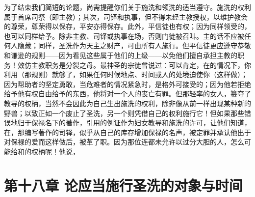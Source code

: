 为了结束我们简短的论题，尚需提醒你们关于施洗和领洗的适当遵守。施洗的权利属于首席司祭（即主教）；其次，司铎和执事，但不得未经主教授权，以维护教会的尊荣，尊荣得以保存，平安亦得保存。此外，平信徒也有权；因为同样领受的，也可以同样给予。除非主教、司铎或执事在场，否则门徒被召叫。主的话不应被任何人隐藏；同样，圣洗作为天主之财产，可由所有人施行。但平信徒更应遵守恭敬和谦逊的规则——因为看见这些属于他们的上级——以免他们擅自承担主教的职务！效仿主教职务是分裂之母。最神圣的宗徒曾说过：可以肯定，在的情况下，你利用（那规则）就够了，如果任何时候地点、时间或人的处境迫使你（这样做）；因为帮助者的坚定勇敢，当危难者的情况紧急时，是格外可接受的；因为他若拒绝给予他有权自由给予的东西，他将对一个人的丧亡有罪。但那轻率的女人，篡夺了教导的权柄，当然不会因此为自己生出施洗的权利，除非像从前一样出现某种新的野兽；以致正如一个废止了圣洗，另一个则凭借自己的权利施行它！但如果那些错误地归于保禄名下的著作，引用的例证作为妇女教导和施洗的许可，让他们知道，在，那编写著作的司铎，似乎从自己的库存增加保禄的名声，被定罪并承认他出于对保禄的爱而这样做后，被革了职。因为那位连都未允许以过分大胆的人，怎么可能给和的权柄呢！他说，\par


\section{第十八章 论应当施行圣洗的对象与时间}

